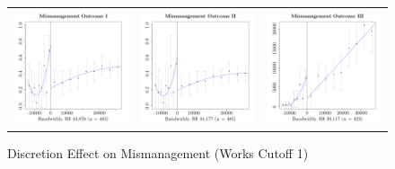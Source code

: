 \documentclass[11pt]{article}
\begin{document}
\begin{figure}[!htbp]
  \caption{\label{fig:workscutoff1} Discretion Effect on Mismanagement (Works Cutoff 1)}
  \centering
  \begin{tabular}{ccc}
  \includegraphics[scale = .265]{workscutoff1.png} & \includegraphics[scale = .265]{workscutoff2.png} & \includegraphics[scale = .265]{workscutoff3.png} \\

\end{tabular}
\end{figure}
\end{document}

